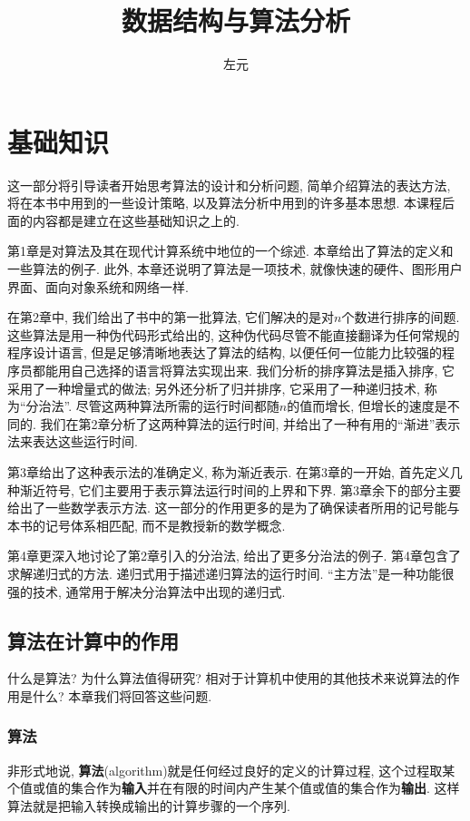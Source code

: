 \documentclass[oneside,10pt]{ctexbook}
\title{数据结构与算法分析}
\author{左元}
\begin{document}
\maketitle
\tableofcontents

\part{基础知识}

这一部分将引导读者开始思考算法的设计和分析问题, 简单介绍算法的表达方法, 将在本书中用到的一些设计策略, 以及算法分析中用到的许多基本思想. 本课程后面的内容都是建立在这些基础知识之上的.

第1章是对算法及其在现代计算系统中地位的一个综述. 本章给出了算法的定义和一些算法的例子. 此外, 本章还说明了算法是一项技术, 就像快速的硬件、图形用户界面、面向对象系统和网络一样.

在第2章中, 我们给出了书中的第一批算法, 它们解决的是对$n$个数进行排序的间题. 这些算法是用一种伪代码形式给出的, 这种伪代码尽管不能直接翻译为任何常规的程序设计语言, 但是足够清晰地表达了算法的结构, 以便任何一位能力比较强的程序员都能用自己选择的语言将算法实现出来. 我们分析的排序算法是插入排序, 它采用了一种增量式的做法; 另外还分析了归并排序, 它采用了一种递归技术, 称为``分治法''. 尽管这两种算法所需的运行时间都随$n$的值而增长, 但增长的速度是不同的. 我们在第2章分析了这两种算法的运行时间, 并给出了一种有用的``渐进''表示法来表达这些运行时间.

第3章给出了这种表示法的准确定义, 称为渐近表示. 在第3章的一开始, 首先定义几种渐近符号, 它们主要用于表示算法运行时间的上界和下界. 第3章余下的部分主要给出了一些数学表示方法. 这一部分的作用更多的是为了确保读者所用的记号能与本书的记号体系相匹配, 而不是教授新的数学概念.

第4章更深入地讨论了第2章引入的分治法, 给出了更多分治法的例子. 第4章包含了求解递归式的方法. 递归式用于描述递归算法的运行时间. ``主方法''是一种功能很强的技术, 通常用于解决分治算法中出现的递归式.

\chapter{算法在计算中的作用}

什么是算法? 为什么算法值得研究? 相对于计算机中使用的其他技术来说算法的作用是什么? 本章我们将回答这些问题.

\section{算法}

非形式地说, \textbf{算法}(algorithm)就是任何经过良好的定义的计算过程, 这个过程取某个值或值的集合作为\textbf{输入}并在有限的时间内产生某个值或值的集合作为\textbf{输出}. 这样算法就是把输入转换成输出的计算步骤的一个序列.
\end{document}
